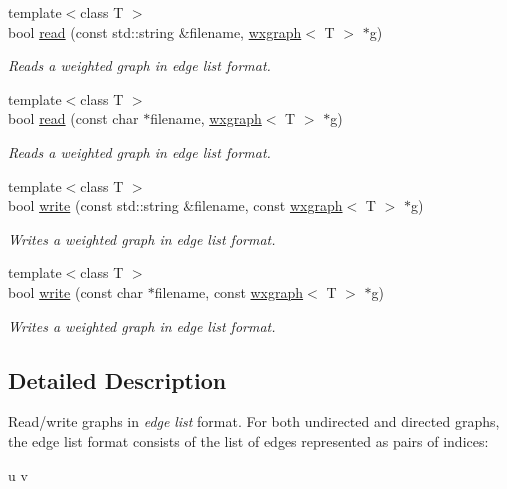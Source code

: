 \begin{DoxyCompactItemize}
{\footnotesize template$<$class T $>$ }\\bool \hyperlink{namespacelgraph_1_1io_1_1edge__list_ab421e520957c993c352796a839e38173}{read} (const std\-::string \&filename, \hyperlink{classlgraph_1_1wxgraph}{wxgraph}$<$ T $>$ $\ast$g)
\begin{DoxyCompactList}\small\item\em Reads a weighted graph in edge list format. \end{DoxyCompactList}\item 
{\footnotesize template$<$class T $>$ }\\bool \hyperlink{namespacelgraph_1_1io_1_1edge__list_af10b33e98f0f7df9dd555006a69ad0de}{read} (const char $\ast$filename, \hyperlink{classlgraph_1_1wxgraph}{wxgraph}$<$ T $>$ $\ast$g)
\begin{DoxyCompactList}\small\item\em Reads a weighted graph in edge list format. \end{DoxyCompactList}\item 
{\footnotesize template$<$class T $>$ }\\bool \hyperlink{namespacelgraph_1_1io_1_1edge__list_ae422e4d5062831a958585527065208e7}{write} (const std\-::string \&filename, const \hyperlink{classlgraph_1_1wxgraph}{wxgraph}$<$ T $>$ $\ast$g)
\begin{DoxyCompactList}\small\item\em Writes a weighted graph in edge list format. \end{DoxyCompactList}\item 
{\footnotesize template$<$class T $>$ }\\bool \hyperlink{namespacelgraph_1_1io_1_1edge__list_ab8a0f64a5850e4c9741fcb2fc53646b7}{write} (const char $\ast$filename, const \hyperlink{classlgraph_1_1wxgraph}{wxgraph}$<$ T $>$ $\ast$g)
\begin{DoxyCompactList}\small\item\em Writes a weighted graph in edge list format. \end{DoxyCompactList}\end{DoxyCompactItemize}


\subsection{Detailed Description}
Read/write graphs in {\itshape edge} {\itshape list} format. For both undirected and directed graphs, the edge list format consists of the list of edges represented as pairs of indices\-: \begin{DoxyVerb}u v
\end{DoxyVerb}


